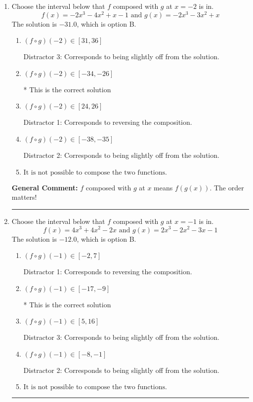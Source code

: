 \documentclass{extbook}[14pt]
\newcommand{\litem}[1]{\item #1

\rule{\textwidth}{0.4pt}}
\begin{document}
\begin{enumerate}\litem{
Choose the interval below that $f$ composed with $g$ at $x=-2$ is in.
\[ f(x) = -2x^{3} -4 x^{2} +x -1 \text{ and } g(x) = -2x^{3} -3 x^{2} +x \]The solution is \( -31.0 \), which is option B.\begin{enumerate}[label=\Alph*.]
\item \( (f \circ g)(-2) \in [31, 36] \)

 Distractor 3: Corresponds to being slightly off from the solution.
\item \( (f \circ g)(-2) \in [-34, -26] \)

* This is the correct solution
\item \( (f \circ g)(-2) \in [24, 26] \)

 Distractor 1: Corresponds to reversing the composition.
\item \( (f \circ g)(-2) \in [-38, -35] \)

 Distractor 2: Corresponds to being slightly off from the solution.
\item \( \text{It is not possible to compose the two functions.} \)


\end{enumerate}

\textbf{General Comment:} $f$ composed with $g$ at $x$ means $f(g(x))$. The order matters!
}
\litem{
Choose the interval below that $f$ composed with $g$ at $x=-1$ is in.
\[ f(x) = 4x^{3} +4 x^{2} -2 x \text{ and } g(x) = 2x^{3} -2 x^{2} -3 x -1 \]The solution is \( -12.0 \), which is option B.\begin{enumerate}[label=\Alph*.]
\item \( (f \circ g)(-1) \in [-2, 7] \)

 Distractor 1: Corresponds to reversing the composition.
\item \( (f \circ g)(-1) \in [-17, -9] \)

* This is the correct solution
\item \( (f \circ g)(-1) \in [5, 16] \)

 Distractor 3: Corresponds to being slightly off from the solution.
\item \( (f \circ g)(-1) \in [-8, -1] \)

 Distractor 2: Corresponds to being slightly off from the solution.
\item \( \text{It is not possible to compose the two functions.} \)


\end{enumerate}

}
\end{enumerate}
\end{document}
